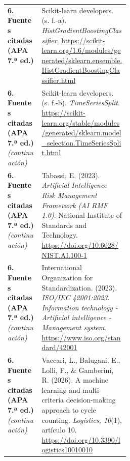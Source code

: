 \documentclass[11pt]{article}
\begin{document}
\begin{longtable}{@{}>{\raggedright\arraybackslash}p{0.28\linewidth}>{\raggedright\arraybackslash}p{}@{}}
\\
\midrule
\textbf{6. Fuentes citadas (APA 7.ª ed.)}\label{fuentes-citadas-apa-7.uxaa-ed.-1} &
Scikit-learn developers. (s. f.-a). \emph{HistGradientBoostingClassifier}. \url{https://scikit-learn.org/1.6/modules/generated/sklearn.ensemble.HistGradientBoostingClassifier.html}
\\
\textbf{6. Fuentes citadas (APA 7.ª ed.)} \emph{(continuación)} &
Scikit-learn developers. (s. f.-b). \emph{TimeSeriesSplit}. \url{https://scikit-learn.org/stable/modules/generated/sklearn.model_selection.TimeSeriesSplit.html}
\\
\textbf{6. Fuentes citadas (APA 7.ª ed.)} \emph{(continuación)} &
Tabassi, E. (2023). \emph{Artificial Intelligence Risk Management Framework (AI RMF 1.0)}. National Institute of Standards and Technology. \url{https://doi.org/10.6028/NIST.AI.100-1}
\\
\textbf{6. Fuentes citadas (APA 7.ª ed.)} \emph{(continuación)} &
International Organization for Standardization. (2023). \emph{ISO/IEC 42001:2023. Information technology - Artificial intelligence - Management system}. \url{https://www.iso.org/standard/42001}
\\
\textbf{6. Fuentes citadas (APA 7.ª ed.)} \emph{(continuación)} &
Vaccari, L., Balugani, E., Lolli, F., \& Gamberini, R. (2026). A machine learning and multi-criteria decision-making approach to cycle counting. \emph{Logistics, 10}(1), artículo 10. \url{https://doi.org/10.3390/logistics10010010}
\\


\end{longtable}
\end{document}
